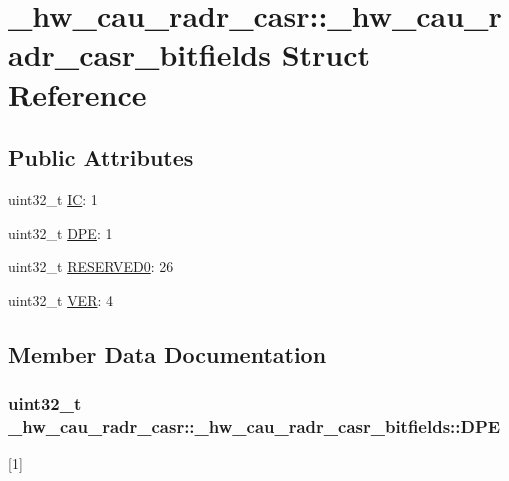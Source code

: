 \hypertarget{struct__hw__cau__radr__casr_1_1__hw__cau__radr__casr__bitfields}{}\section{\+\_\+hw\+\_\+cau\+\_\+radr\+\_\+casr\+:\+:\+\_\+hw\+\_\+cau\+\_\+radr\+\_\+casr\+\_\+bitfields Struct Reference}
\label{struct__hw__cau__radr__casr_1_1__hw__cau__radr__casr__bitfields}
\subsection*{Public Attributes}
\begin{DoxyCompactItemize}
\item 
uint32\+\_\+t \hyperlink{struct__hw__cau__radr__casr_1_1__hw__cau__radr__casr__bitfields_a7b2605beba44ccef1a82489877e1f898}{IC}\+: 1
\item 
uint32\+\_\+t \hyperlink{struct__hw__cau__radr__casr_1_1__hw__cau__radr__casr__bitfields_ac52bf7c777180ffce6d03da187d9cac0}{D\+PE}\+: 1
\item 
uint32\+\_\+t \hyperlink{struct__hw__cau__radr__casr_1_1__hw__cau__radr__casr__bitfields_ab714032dc1a3428c549efe22c4b31f47}{R\+E\+S\+E\+R\+V\+E\+D0}\+: 26
\item 
uint32\+\_\+t \hyperlink{struct__hw__cau__radr__casr_1_1__hw__cau__radr__casr__bitfields_aafbc75da23703c234a0c45e45f389de9}{V\+ER}\+: 4
\end{DoxyCompactItemize}


\subsection{Member Data Documentation}
\subsubsection[{\texorpdfstring{D\+PE}{DPE}}]{\setlength{\rightskip}{0pt plus 5cm}uint32\+\_\+t \+\_\+hw\+\_\+cau\+\_\+radr\+\_\+casr\+::\+\_\+hw\+\_\+cau\+\_\+radr\+\_\+casr\+\_\+bitfields\+::\+D\+PE}\hypertarget{struct__hw__cau__radr__casr_1_1__hw__cau__radr__casr__bitfields_ac52bf7c777180ffce6d03da187d9cac0}{}\label{struct__hw__cau__radr__casr_1_1__hw__cau__radr__casr__bitfields_ac52bf7c777180ffce6d03da187d9cac0}
\mbox{[}1\mbox{]} 
